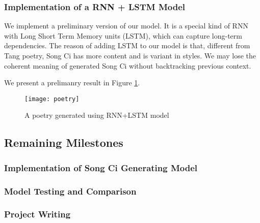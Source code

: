 \subsubsection{ Implementation of a RNN + LSTM Model  }   
We implement a preliminary version of our model. It is a special kind of RNN with Long Short Term Memory units (LSTM), which can capture long-term dependencies.
%
The reason of adding LSTM to our model is that,  different from Tang poetry, Song Ci has more content  and is variant in styles.
%
We may lose the coherent meaning of generated Song Ci without backtracking previous context.

%
We present a prelimanry result in Figure \ref{fig:poetry}. 

 
\begin{figure}[htbp]
	\centering
	\texttt{[image: poetry]}
	\caption{A poetry generated using RNN+LSTM model}
	\label{fig:poetry}	
\end{figure} 


\subsection{Remaining Milestones}
%
\subsubsection{Implementation of Song Ci Generating Model }
\subsubsection{Model Testing and Comparison}
\subsubsection{Project Writing} 
